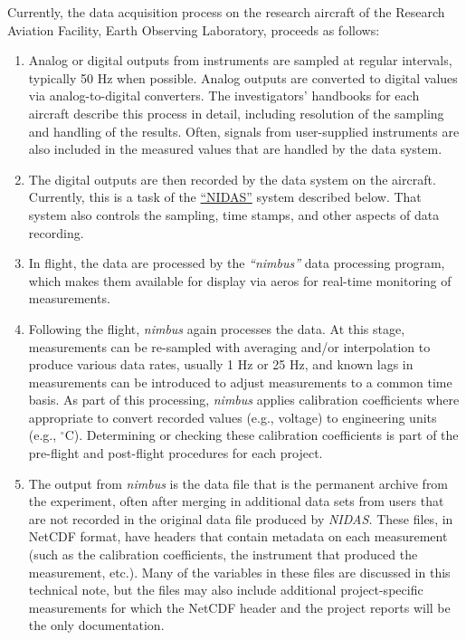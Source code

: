 \documentclass[
  english,
]{book}
\providecommand{\tightlist}{%
  \setlength{\itemsep}{0pt}\setlength{\parskip}{0pt}}
\begin{document}
Currently, the data acquisition process on the research aircraft of the
Research Aviation Facility, Earth Observing Laboratory, proceeds as
follows:

\begin{enumerate}
\def\labelenumi{\arabic{enumi}.}
\tightlist
\item
  Analog or digital outputs from instruments are sampled at regular
  intervals, typically 50 Hz when possible. Analog outputs are converted
  to digital values via analog-to-digital converters. The investigators'
  handbooks for each aircraft describe this process in detail, including
  resolution of the sampling and handling of the results. Often, signals
  from user-supplied instruments are also included in the measured
  values that are handled by the data system.\\
\item
  The digital outputs are then recorded by the data system on the
  aircraft. Currently, this is a task of the
  \href{http://www.eol.ucar.edu/data/software/nidas}{``NIDAS''} system
  described below. That system also controls the sampling, time stamps,
  and other aspects of data recording.\\
\item
  In flight, the data are processed by the \emph{``nimbus''} data
  processing program, which makes them available for display via aeros
  for real-time monitoring of measurements.\\
\item
  Following the flight, \emph{nimbus} again processes the data. At this
  stage, measurements can be re-sampled with averaging and/or
  interpolation to produce various data rates, usually 1 Hz or 25 Hz,
  and known lags in measurements can be introduced to adjust
  measurements to a common time basis. As part of this processing,
  \emph{nimbus} applies calibration coefficients where appropriate to
  convert recorded values (e.g., voltage) to engineering units (e.g.,
  \(^\circ\)C). Determining or checking these calibration coefficients
  is part of the pre-flight and post-flight procedures for each
  project.\\
\item
  The output from \emph{nimbus} is the data file that is the permanent
  archive from the experiment, often after merging in additional data
  sets from users that are not recorded in the original data file
  produced by \emph{NIDAS.} These files, in NetCDF format, have headers
  that contain metadata on each measurement (such as the calibration
  coefficients, the instrument that produced the measurement, etc.).
  Many of the variables in these files are discussed in this technical
  note, but the files may also include additional project-specific
  measurements for which the NetCDF header and the project reports will
  be the only documentation.
\end{enumerate}
\end{document}
